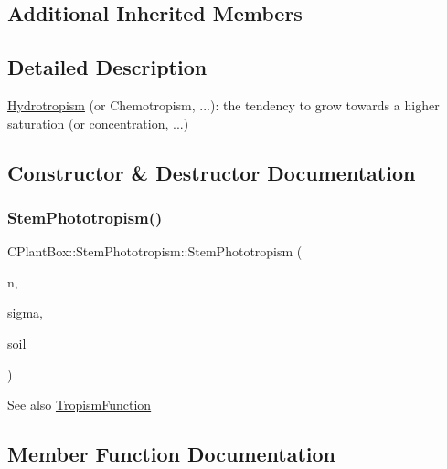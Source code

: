 \subsection*{Additional Inherited Members}


\subsection{Detailed Description}
\hyperlink{classCPlantBox_1_1Hydrotropism}{Hydrotropism} (or Chemotropism, ...)\+: the tendency to grow towards a higher saturation (or concentration, ...) 

\subsection{Constructor \& Destructor Documentation}
\mbox{\label{classCPlantBox_1_1StemPhototropism_a239ba8a1f21b0990812c7288bac46a9d}} 
\subsubsection{\texorpdfstring{Stem\+Phototropism()}{StemPhototropism()}}
{\footnotesize\ttfamily C\+Plant\+Box\+::\+Stem\+Phototropism\+::\+Stem\+Phototropism (\begin{DoxyParamCaption}\item[{double}]{n,  }\item[{double}]{sigma,  }\item[{\hyperlink{classCPlantBox_1_1SoilLookUp}{Soil\+Look\+Up} $\ast$}]{soil }\end{DoxyParamCaption})\hspace{0.3cm}{\ttfamily [inline]}}

\begin{DoxySeeAlso}{See also}
\hyperlink{classCPlantBox_1_1TropismFunction}{Tropism\+Function} 
\end{DoxySeeAlso}


\subsection{Member Function Documentation}
\mbox{\label{classCPlantBox_1_1StemPhototropism_a41e742911835bb5b8dba8c8814d4a0f9}} 
